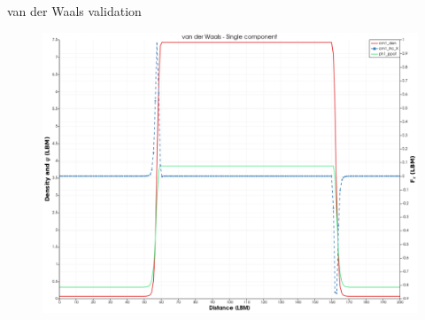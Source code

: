 \documentclass{beamer}
\begin{document}
	\begin{frame}{van der Waals validation}
		\begin{figure}
			\includegraphics[scale=0.2]{pics/vdwValidation.png}
		\end{figure}
	\end{frame}
\end{document}
